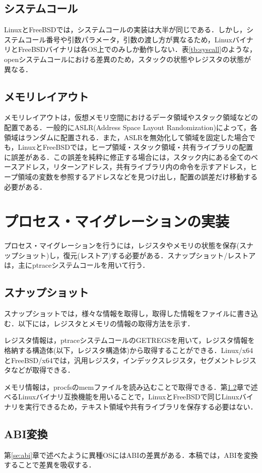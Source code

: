 \documentclass{ipsjpapers}
\begin{document}
\subsection{システムコール}
LinuxとFreeBSDでは，システムコールの実装は大半が同じである．しかし，システムコール番号や引数パラメータ，引数の渡し方が異なるため，LinuxバイナリとFreeBSDバイナリは各OS上でのみしか動作しない．表\ref{tb:syscall}のような，openシステムコールにおける差異のため，スタックの状態やレジスタの状態が異なる．
\subsection{メモリレイアウト}
メモリレイアウトは，仮想メモリ空間におけるデータ領域やスタック領域などの配置である．一般的にASLR(Address Space Layout Randomization)によって，各領域はランダムに配置される．また，ASLRを無効化して領域を固定した場合でも，LinuxとFreeBSDでは，ヒープ領域・スタック領域・共有ライブラリの配置に誤差がある．この誤差を純粋に修正する場合には，スタック内にある全てのベースアドレス，リターンアドレス，共有ライブラリ内の命令を示すアドレス，ヒープ領域の変数を参照するアドレスなどを見つけ出し，配置の誤差だけ移動する必要がある．

\section{プロセス・マイグレーションの実装}
プロセス・マイグレーションを行うには，レジスタやメモリの状態を保存(スナップショット)し，復元(レストア)する必要がある．スナップショット/レストアは，主にptraceシステムコールを用いて行う．

\subsection{スナップショット}
スナップショットでは，様々な情報を取得し，取得した情報をファイルに書き込む．以下には，レジスタとメモリの情報の取得方法を示す．

レジスタ情報は，ptraceシステムコールのGETREGSを用いて，レジスタ情報を格納する構造体(以下，レジスタ構造体)から取得することができる．Linux\slash{}x64とFreeBSD\slash{}x64では，汎用レジスタ，インデックスレジスタ，セグメントレジスタなどが取得できる．

メモリ情報は，procfsのmemファイルを読み込むことで取得できる．第\ref{se:conv}章で述べるLinuxバイナリ互換機能を用いることで，LinuxとFreeBSDで同じLinuxバイナリを実行できるため，テキスト領域や共有ライブラリを保存する必要はない．
\subsection{ABI変換}
\label{se:conv}
第\ref{se:abi}章で述べたように異種OSにはABIの差異がある．本稿では，ABIを変換することで差異を吸収する．
\end{document}
